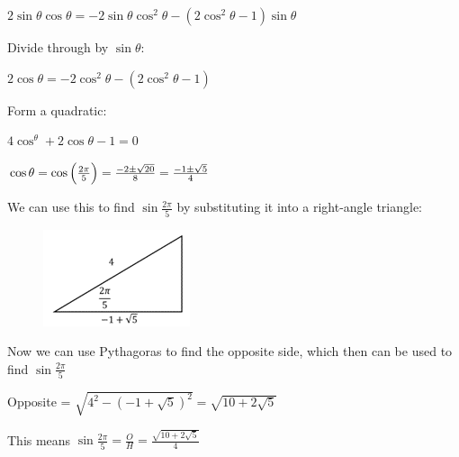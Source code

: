 \documentclass[../main.tex]{subfiles}
\begin{document}
\begin{enumerate}[itemsep=0.4cm]
    $2\sin{\theta}\cos{\theta}=-2\sin{\theta}\cos^2{\theta}-(2\cos^2{\theta}-1)\sin{\theta}$

    Divide through by $\sin{\theta}$:

    $2\cos{\theta}=-2\cos^2{\theta}-(2\cos^2{\theta}-1)$

    Form a quadratic:

    $4\cos^{\theta}+2\cos{\theta}-1=0$

    $\cos{\theta}=\cos{\Bigl(\frac{2\pi}{5}\Bigr)}=\frac{-2\pm \sqrt{20}}{8}=\frac{-1\pm \sqrt{5}}{4}$

    We can use this to find $\sin{\frac{2\pi}{5}}$ by substituting it into a right-angle triangle:

    \begin{figure}[h]
        \centering
        \includegraphics[width=0.2\linewidth]{images/exacttrigvalues2.png}
    \end{figure}

    Now we can use Pythagoras to find the opposite side, which then can be used to find $\sin{\frac{2\pi}{5}}$

    Opposite = $\sqrt{4^2-(-1+\sqrt{5})^2}=\sqrt{10+2\sqrt{5}}$

    This means $\sin{\frac{2\pi}{5}}=\frac{O}{H}=\frac{\sqrt{10+2\sqrt{5}}}{4}$
\end{enumerate}
\end{document}
